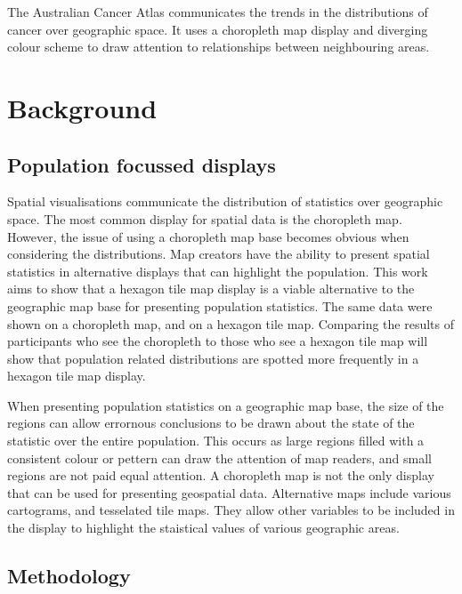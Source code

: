 \documentclass[conference,final,]{IEEEtran}
\begin{document}
The Australian Cancer Atlas communicates the trends in the distributions
of cancer over geographic space. It uses a choropleth map display and
diverging colour scheme to draw attention to relationships between
neighbouring areas.

\hypertarget{background}{%
\section{Background}\label{background}}

\hypertarget{population-focussed-displays}{%
\subsection{Population focussed
displays}\label{population-focussed-displays}}

Spatial visualisations communicate the distribution of statistics over
geographic space. The most common display for spatial data is the
choropleth map. However, the issue of using a choropleth map base
becomes obvious when considering the distributions. Map creators have
the ability to present spatial statistics in alternative displays that
can highlight the population. This work aims to show that a hexagon tile
map display is a viable alternative to the geographic map base for
presenting population statistics. The same data were shown on a
choropleth map, and on a hexagon tile map. Comparing the results of
participants who see the choropleth to those who see a hexagon tile map
will show that population related distributions are spotted more
frequently in a hexagon tile map display.

When presenting population statistics on a geographic map base, the size
of the regions can allow errornous conclusions to be drawn about the
state of the statistic over the entire population. This occurs as large
regions filled with a consistent colour or pettern can draw the
attention of map readers, and small regions are not paid equal
attention. A choropleth map is not the only display that can be used for
presenting geospatial data. Alternative maps include various cartograms,
and tesselated tile maps. They allow other variables to be included in
the display to highlight the staistical values of various geographic
areas.

\hypertarget{methodology}{%
\subsection{Methodology}\label{methodology}}
\end{document}
